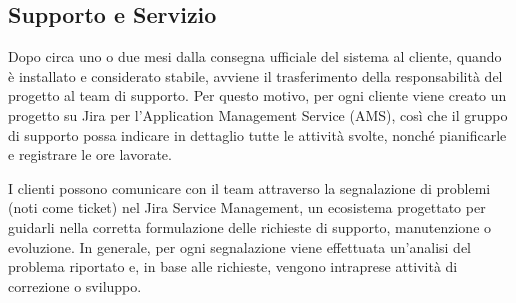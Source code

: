     \subsection{Supporto e Servizio}
    Dopo circa uno o due mesi dalla consegna ufficiale del sistema al cliente, quando è installato e considerato stabile, avviene il trasferimento della
    responsabilità del progetto al team di supporto. Per questo motivo, per ogni cliente viene creato un progetto su Jira per l'Application Management Service (AMS),
    così che il gruppo di supporto possa indicare in dettaglio tutte le attività svolte, nonché pianificarle e registrare le ore lavorate.

    I clienti possono comunicare con il team attraverso la segnalazione di problemi (noti come ticket) nel Jira Service Management, un ecosistema progettato per
    guidarli nella corretta formulazione delle richieste di supporto, manutenzione o evoluzione. In generale, per ogni segnalazione viene effettuata un'analisi
    del problema riportato e, in base alle richieste, vengono intraprese attività di correzione o sviluppo.

